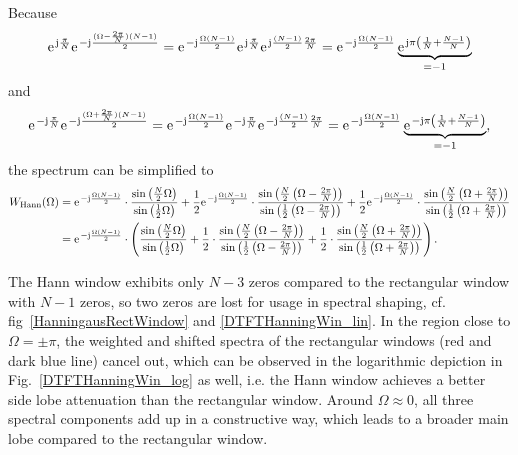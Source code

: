 \documentclass[11pt,a4paper,DIV=12]{scrartcl}
\begin{document}
%
Because
%
\begin{equation}
\e^{\im\frac{\pi}{N}}\e^{-\im\frac{(\Omega-\frac{2\pi}{N})(N-1)}{2}}=\e^{-\im\frac{\Omega(N-1)}{2}}\e^{\im\frac{\pi}{N}}\e^{\im\frac{(N-1)}{2}\frac{2\pi}{N}}
=\e^{-\im\frac{\Omega(N-1)}{2}}\underbrace{\e^{\im\pi\left(\frac{1}{N}+\frac{N-1}{N}\right)}}_{=-1}
\end{equation}
%
and
%
\begin{equation}
\e^{-\im\frac{\pi}{N}}\e^{-\im\frac{(\Omega+\frac{2\pi}{N})(N-1)}{2}}=\e^{-\im\frac{\Omega(N-1)}{2}}\e^{-\im\frac{\pi}{N}}\e^{-\im\frac{(N-1)}{2}\frac{2\pi}{N}}
=\e^{-\im\frac{\Omega(N-1)}{2}}\underbrace{\e^{-\im\pi\left(\frac{1}{N}+\frac{N-1}{N}\right)}}_{=-1},
\end{equation}
%
the spectrum can be simplified to
%
\begin{align}
W_{\text{Hann}}(\Omega)&=\e^{-\im\frac{\Omega(N-1)}{2}}\cdot\frac{\sin\left(\frac{N}{2}\Omega\right)}{\sin\left(\frac{1}{2}\Omega\right)}+\frac{1}{2}\e^{-\im\frac{\Omega(N-1)}{2}}\cdot\frac{\sin\left(\frac{N}{2}\left(\Omega-\frac{2\pi}{N}\right)\right)}{\sin\left(\frac{1}{2}\left(\Omega-\frac{2\pi}{N}\right)\right)}+\frac{1}{2}\e^{-\im\frac{\Omega(N-1)}{2}}\cdot\frac{\sin\left(\frac{N}{2}\left(\Omega+\frac{2\pi}{N}\right)\right)}{\sin\left(\frac{1}{2}\left(\Omega+\frac{2\pi}{N}\right)\right)}\\
&=\e^{-\im\frac{\Omega(N-1)}{2}}\cdot\left(\frac{\sin\left(\frac{N}{2}\Omega\right)}{\sin\left(\frac{1}{2}\Omega\right)}+\frac{1}{2}\cdot\frac{\sin\left(\frac{N}{2}\left(\Omega-\frac{2\pi}{N}\right)\right)}{\sin\left(\frac{1}{2}\left(\Omega-\frac{2\pi}{N}\right)\right)}+\frac{1}{2}\cdot\frac{\sin\left(\frac{N}{2}\left(\Omega+\frac{2\pi}{N}\right)\right)}{\sin\left(\frac{1}{2}\left(\Omega+\frac{2\pi}{N}\right)\right)}\right).
\end{align}

The Hann window exhibits only $N-3$ zeros compared to the rectangular window
with $N-1$ zeros, so two zeros are lost for usage in spectral shaping,
cf. fig~\ref{HanningausRectWindow} and \ref{DTFTHanningWin_lin}.
%
In the region close to $\Omega=\pm\pi$, the weighted and shifted spectra of
the rectangular windows (red and dark blue line) cancel out, which can be
observed in the logarithmic depiction in Fig.~\ref{DTFTHanningWin_log} as well,
i.e. the Hann window achieves a better side lobe attenuation than the
rectangular window.
%
Around $\Omega\approx 0$, all three spectral components add up in a constructive
way, which leads to a broader main lobe compared to the rectangular window.
\end{document}
